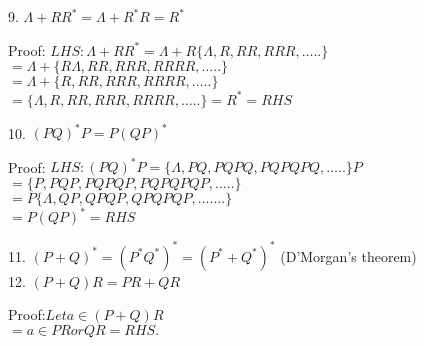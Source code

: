 	\begin{frame}		
\!\!\!\!\!\!\!\!\!\!\!\!\!\!\!\!\!\!\!\!\begin{solution}
\begin{listing} 
  9. $\Lambda + RR^* = \Lambda +  R^*R = R^*$\\\vspace{2mm}

\quad Proof: $LHS: \Lambda + RR^* = \Lambda + R \{\Lambda, R, RR, RRR, ….. \}$\\
\qquad\qquad$ = \Lambda + \{R\Lambda, RR, RRR, RRRR, ….. \}$\\
\qquad\qquad$ = \Lambda + \{R, RR, RRR, RRRR, ….. \}$\\
\qquad\qquad$ = \{\Lambda, R, RR, RRR, RRRR, ….. \} = R^* = RHS$\\\vspace{2mm}

   10. $(PQ)^*P = P(QP)^*$\\\vspace{2mm}

\quad Proof: $LHS: (PQ)^*P = \{\Lambda, PQ, PQPQ, PQPQPQ, ….. \}P$\\
\qquad\qquad$= \{P,PQP, PQPQP, PQPQPQP,…..\}$\\
\qquad\qquad$= P\{\Lambda, QP, QPQP, QPQPQP, ……. \}$\\
\qquad\qquad$= P(QP)^* = RHS$
\end{listing}
\end{solution}		
	\end{frame}	
	\begin{frame}		
\!\!\!\!\!\!\!\!\!\!\!\!\!\!\!\!\!\!\!\!\begin{solution}
\begin{listing} 
   11. $(P + Q)^* = (P^*Q^*)^* = (P^* + Q^*)^*$ (D’Morgan’s theorem)\\\vspace{2mm}
   12. $(P + Q)R = PR + QR$\\\vspace{2mm}

\quad  Proof:$ Let a \in (P+Q)R$\\
\qquad\qquad$= a \in PR or QR = RHS.$\\
\end{listing}
\end{solution}	
	\end{frame}	
